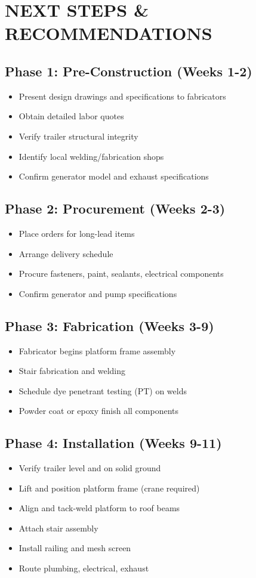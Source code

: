 \documentclass[11pt,letter]{article}
\begin{document}
\section{NEXT STEPS \& RECOMMENDATIONS}

\subsection{Phase 1: Pre-Construction (Weeks 1-2)}
\begin{itemize}
  \item Present design drawings and specifications to fabricators
  \item Obtain detailed labor quotes
  \item Verify trailer structural integrity
  \item Identify local welding/fabrication shops
  \item Confirm generator model and exhaust specifications
\end{itemize}

\subsection{Phase 2: Procurement (Weeks 2-3)}
\begin{itemize}
  \item Place orders for long-lead items
  \item Arrange delivery schedule
  \item Procure fasteners, paint, sealants, electrical components
  \item Confirm generator and pump specifications
\end{itemize}

\subsection{Phase 3: Fabrication (Weeks 3-9)}
\begin{itemize}
  \item Fabricator begins platform frame assembly
  \item Stair fabrication and welding
  \item Schedule dye penetrant testing (PT) on welds
  \item Powder coat or epoxy finish all components
\end{itemize}

\subsection{Phase 4: Installation (Weeks 9-11)}
\begin{itemize}
  \item Verify trailer level and on solid ground
  \item Lift and position platform frame (crane required)
  \item Align and tack-weld platform to roof beams
  \item Attach stair assembly
  \item Install railing and mesh screen
  \item Route plumbing, electrical, exhaust
\end{itemize}
\end{document}
